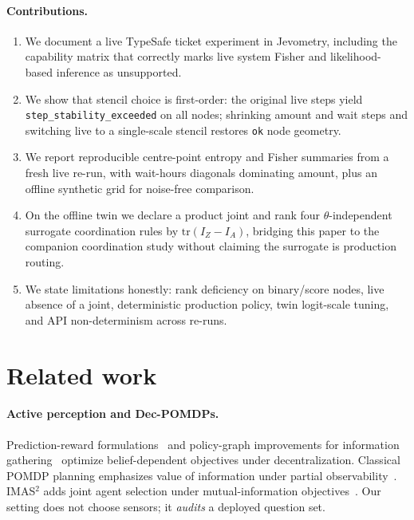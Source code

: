 \documentclass[11pt,a4paper]{article}
\begin{document}
\paragraph{Contributions.}
\begin{enumerate}
  \item We document a live TypeSafe ticket experiment in Jevometry, including
  the capability matrix that correctly marks live system Fisher and
  likelihood-based inference as unsupported.
  \item We show that stencil choice is first-order: the original live steps
  yield \texttt{step\_stability\_exceeded} on all nodes; shrinking amount and
  wait steps and switching live to a single-scale stencil restores
  \texttt{ok} node geometry.
  \item We report reproducible centre-point entropy and Fisher summaries from a
  fresh live re-run, with wait-hours diagonals dominating amount, plus an
  offline synthetic grid for noise-free comparison.
  \item On the offline twin we declare a product joint and rank four
  $\theta$-independent surrogate coordination rules by
  $\mathrm{tr}(I_Z-I_A)$, bridging this paper to the companion coordination
  study without claiming the surrogate is production routing.
  \item We state limitations honestly: rank deficiency on binary/score nodes,
  live absence of a joint, deterministic production policy, twin logit-scale
  tuning, and API non-determinism across re-runs.
\end{enumerate}

\section{Related work}

\paragraph{Active perception and Dec-POMDPs.}
Prediction-reward formulations~\citep{lauri2020prediction} and
policy-graph improvements for information gathering~\citep{lauri2020decpomdp}
optimize belief-dependent objectives under decentralization. Classical POMDP
planning emphasizes value of information under partial
observability~\citep{kaelbling1998planning,oliehoek2016decpomdp}. IMAS$^2$
adds joint agent selection under mutual-information
objectives~\citep{shi2026imas2}. Our setting does not choose sensors; it
\emph{audits} a deployed question set.
\end{document}
